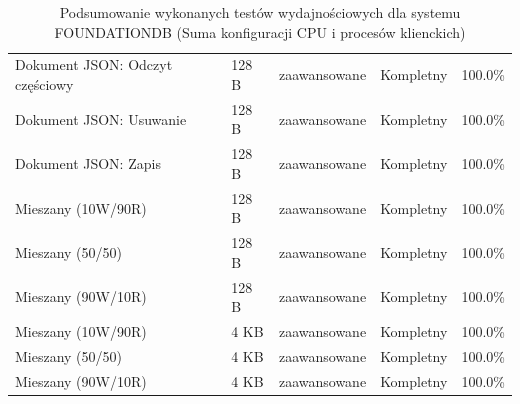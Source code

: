 \begin{table}[ht]
{\begin{tabular}{lllcc}
Dokument JSON: Odczyt częściowy & 128 B & zaawansowane & Kompletny & 100.0\% \\
Dokument JSON: Usuwanie & 128 B & zaawansowane & Kompletny & 100.0\% \\
Dokument JSON: Zapis & 128 B & zaawansowane & Kompletny & 100.0\% \\
Mieszany (10W/90R) & 128 B & zaawansowane & Kompletny & 100.0\% \\
Mieszany (50/50) & 128 B & zaawansowane & Kompletny & 100.0\% \\
Mieszany (90W/10R) & 128 B & zaawansowane & Kompletny & 100.0\% \\
Mieszany (10W/90R) & 4 KB & zaawansowane & Kompletny & 100.0\% \\
Mieszany (50/50) & 4 KB & zaawansowane & Kompletny & 100.0\% \\
Mieszany (90W/10R) & 4 KB & zaawansowane & Kompletny & 100.0\% \\
\bottomrule
\end{tabular}%
}
\caption{Podsumowanie wykonanych testów wydajnościowych dla systemu FOUNDATIONDB (Suma konfiguracji CPU i procesów klienckich)}
\label{tab:executed_tests_foundationdb}
\end{table}

